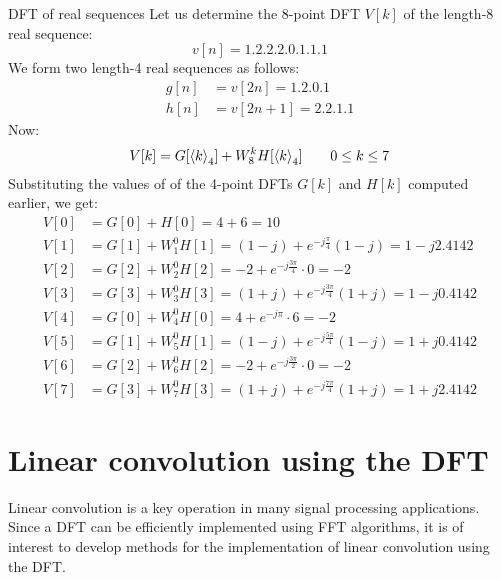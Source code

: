 \documentclass[../../main/main.tex]{subfiles}
\begin{document}
\begin{example}{DFT of real sequences}{}
    Let us determine the 8-point DFT \( V[k] \) of the length-8 real sequence:
    \begin{equation}
        v[n]
        =
        \qty{1,2,2,2,0,1,1,1}
        \label{eq:L13_S12_1}
    \end{equation}
    We form two length-4 real sequences as follows:
    \begin{align}
        g[n] &= v[2n] = \qty{1,2,0,1}   \\
        h[n] &= v[2n+1] = \qty{2,2,1,1}
    \end{align}
    Now:
    \begin{equation}
        V[k]
        =
        G[\expval{k}_{4}] + W_{8}^{k} H[\expval{k}_{4}]
        \qquad
        0 \le k \le 7
        \label{eq:L13_S13_1}
    \end{equation}
    Substituting the values of of the 4-point DFTs \( G[k] \) and \( H[k] \) computed earlier, we get:
    \begin{align}
        V[0] &= G[0] +           H[0] = 4 + 6 = 10  \\
        V[1] &= G[1] + W_{1}^{0} H[1] = (1-j) + e^{-j \frac{\pi}{4}}(1-j) = 1 - j2.4142  \\
        V[2] &= G[2] + W_{2}^{0} H[2] = -2 + e^{-j\frac{3\pi}{4}} \cdot 0 = -2  \\
        V[3] &= G[3] + W_{3}^{0} H[3] = (1+j) + e^{-j \frac{3\pi}{4}}(1+j) = 1 - j0.4142 \\
        V[4] &= G[0] + W_{4}^{0} H[0] = 4 + e^{-j\pi} \cdot 6 = -2   \\
        V[5] &= G[1] + W_{5}^{0} H[1] = (1-j) + e^{-j \frac{5\pi}{4}}(1-j) = 1 + j0.4142    \\
        V[6] &= G[2] + W_{6}^{0} H[2] = -2 + e^{-j\frac{3\pi}{2}} \cdot 0 = -2  \\
        V[7] &= G[3] + W_{7}^{0} H[3] = (1+j) + e^{-j \frac{7\pi}{4}}(1+j) = 1 + j2.4142
    \end{align}
\end{example}




\section{Linear convolution using the DFT}
Linear convolution is a key operation in many signal processing applications. Since a DFT can be efficiently implemented using FFT algorithms, it is of interest to develop methods for the implementation of linear convolution using the DFT.
\end{document}
